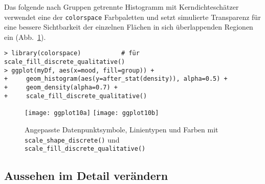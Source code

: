 Das folgende nach Gruppen getrennte Histogramm mit Kerndichteschätzer verwendet eine der \lstinline!colorspace! Farbpaletten und setzt simulierte Transparenz für eine bessere Sichtbarkeit der einzelnen Flächen in sich überlappenden Regionen ein (Abb.\ \ref{fig:ggplot10}).
\begin{lstlisting}
> library(colorspace)           # für scale_fill_discrete_qualitative()
> ggplot(myDf, aes(x=mood, fill=group)) +
+     geom_histogram(aes(y=after_stat(density)), alpha=0.5) +
+     geom_density(alpha=0.7) +
+     scale_fill_discrete_qualitative()
\end{lstlisting}

\begin{figure}[ht]
\centering
\texttt{[image: ggplot10a]}
\texttt{[image: ggplot10b]}
\vspace*{-0.5em}
\caption{Angepasste Datenpunktsymbole, Linientypen und Farben mit \lstinline!scale_shape_discrete()! und \lstinline!scale_fill_discrete_qualitative()!}
\label{fig:ggplot10}
\end{figure}

\subsection{Aussehen im Detail verändern}
\label{sec:ggplotTheme}

